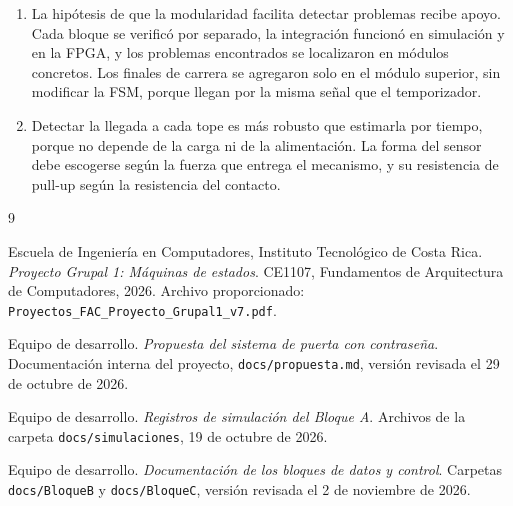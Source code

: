 \documentclass[12pt,letterpaper]{article}
\begin{document}
\begin{enumerate}
    \item La hipótesis de que la modularidad facilita
    detectar problemas recibe apoyo. Cada bloque se
    verificó por separado, la integración funcionó en
    simulación y en la FPGA, y los problemas encontrados
    se localizaron en módulos concretos. Los finales de
    carrera se agregaron solo en el módulo superior, sin
    modificar la FSM, porque llegan por la misma señal que
    el temporizador.

    \item Detectar la llegada a cada tope es más robusto
    que estimarla por tiempo, porque no depende de la carga
    ni de la alimentación. La forma del sensor debe
    escogerse según la fuerza que entrega el mecanismo, y
    su resistencia de pull-up según la resistencia del
    contacto.
\end{enumerate}


\begin{thebibliography}{9}

Escuela de Ingeniería en Computadores,
Instituto Tecnológico de Costa Rica.
\textit{Proyecto Grupal 1: Máquinas de estados}.
CE1107, Fundamentos de Arquitectura de Computadores,
2026. Archivo proporcionado:
\texttt{Proyectos\_FAC\_Proyecto\_Grupal1\_v7.pdf}.

Equipo de desarrollo.
\textit{Propuesta del sistema de puerta con contraseña}.
Documentación interna del proyecto,
\texttt{docs/propuesta.md}, versión revisada
el 29 de octubre de 2026.

Equipo de desarrollo.
\textit{Registros de simulación del Bloque A}.
Archivos de la carpeta
\texttt{docs/simulaciones}, 19 de octubre de 2026.

Equipo de desarrollo.
\textit{Documentación de los bloques de datos y control}.
Carpetas \texttt{docs/BloqueB} y
\texttt{docs/BloqueC}, versión revisada
el 2 de noviembre de 2026.

\end{thebibliography}
\end{document}
